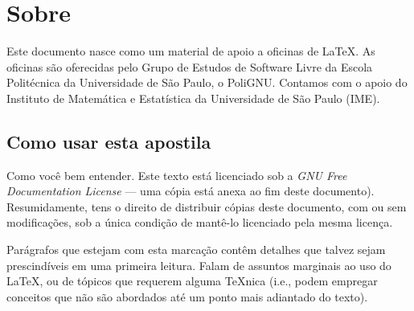 \section*{Sobre}

Este documento nasce como um material de apoio a oficinas de
\LaTeX. As oficinas são oferecidas pelo Grupo de Estudos de Software
Livre da Escola Politécnica da Universidade de São Paulo, o PoliGNU.
Contamos com o apoio do Instituto de Matemática e Estatística da
Universidade de São Paulo (IME).

\subsection*{Como usar esta apostila}

Como você bem entender. Este texto está licenciado sob a \emph{GNU Free
Documentation License} --- uma cópia está anexa ao fim deste documento).
Resumidamente, tens o direito de distribuir cópias deste documento,
com ou sem modificações, sob a única condição de mantê-lo licenciado
pela mesma licença.

\begin{detalhe}
Parágrafos que estejam com esta marcação contêm detalhes que talvez
sejam prescindíveis em uma primeira leitura. Falam de assuntos
marginais ao uso do \LaTeX, ou de tópicos que requerem alguma
\TeX nica (i.e., podem empregar conceitos que não são abordados até
um ponto mais adiantado do texto).
\end{detalhe}



